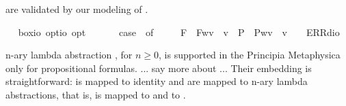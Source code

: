 \begin{isabellebody}
\begin{isamarkuptext}
  are validated by our modeling of \isa{\isactrlbold {\isasymbox}}.%
\end{isamarkuptext}%
\isamarkuptrue%
\ \isamarkupfalse%
\ box{\isacharcolon}{\isacharcolon}{\isachardoublequoteopen}io\ opt{\isasymRightarrow}io\ opt{\isachardoublequoteclose}\ {\isacharparenleft}{\isachardoublequoteopen}\isactrlbold {\isasymbox}{\isacharunderscore}{\isachardoublequoteclose}\ {\isacharbrackleft}{}{}{\isacharbrackright}\ {}{}{\isacharparenright}\ \ {\isachardoublequoteopen}\isactrlbold {\isasymbox}{\isasymphi}\ {\isasymequiv}\ case\ {\isasymphi}\ of\ \isanewline
\ \ \ \ F{\isacharparenleft}{\isasympsi}{\isacharparenright}\ {\isasymRightarrow}\ F{\isacharparenleft}{\isasymlambda}w{\isachardot}{\isasymforall}v{\isachardot}\ {\isasympsi}\ v{\isacharparenright}\ {\isacharbar}\ P{\isacharparenleft}{\isasympsi}{\isacharparenright}\ {\isasymRightarrow}\ P{\isacharparenleft}{\isasymlambda}w{\isachardot}{\isasymforall}v{\isachardot}\ {\isasympsi}\ v{\isacharparenright}\ {\isacharbar}\ {\isacharunderscore}\ {\isasymRightarrow}\ ERR{\isacharparenleft}dio{\isacharparenright}{\isachardoublequoteclose}%
\begin{isamarkuptext}%
n-ary lambda abstraction , for $n\geq 0$, is supported in the Principia
  Metaphysica only for propositional formulas. ... say more about  ... Their embedding is 
  straightforward:  is mapped to identity and  are mapped to n-ary
  lambda abstractions, that is,  is mapped to  and  
  to .

\end{isamarkuptext}
\end{isabellebody}
